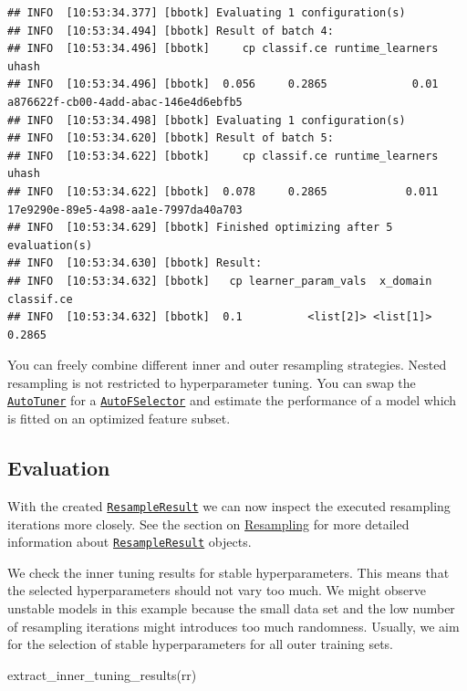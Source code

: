\documentclass[
]{scrbook}
\newenvironment{Shaded}{\begin{snugshade}}{\end{snugshade}}
\newcommand{\FunctionTok}[1]{\textcolor[rgb]{0.00,0.00,0.00}{#1}}
\newcommand{\NormalTok}[1]{#1}
\renewenvironment{Shaded} {\begin{snugshade}\small} {\end{snugshade}}
\begin{document}
\begin{verbatim}
## INFO  [10:53:34.377] [bbotk] Evaluating 1 configuration(s) 
## INFO  [10:53:34.494] [bbotk] Result of batch 4: 
## INFO  [10:53:34.496] [bbotk]     cp classif.ce runtime_learners                                uhash 
## INFO  [10:53:34.496] [bbotk]  0.056     0.2865             0.01 a876622f-cb00-4add-abac-146e4d6ebfb5 
## INFO  [10:53:34.498] [bbotk] Evaluating 1 configuration(s) 
## INFO  [10:53:34.620] [bbotk] Result of batch 5: 
## INFO  [10:53:34.622] [bbotk]     cp classif.ce runtime_learners                                uhash 
## INFO  [10:53:34.622] [bbotk]  0.078     0.2865            0.011 17e9290e-89e5-4a98-aa1e-7997da40a703 
## INFO  [10:53:34.629] [bbotk] Finished optimizing after 5 evaluation(s) 
## INFO  [10:53:34.630] [bbotk] Result: 
## INFO  [10:53:34.632] [bbotk]   cp learner_param_vals  x_domain classif.ce 
## INFO  [10:53:34.632] [bbotk]  0.1          <list[2]> <list[1]>     0.2865
\end{verbatim}

You can freely combine different inner and outer resampling strategies.
Nested resampling is not restricted to hyperparameter tuning.
You can swap the \href{https://mlr3tuning.mlr-org.com/reference/AutoTuner.html}{\texttt{AutoTuner}} for a \href{https://mlr3fselect.mlr-org.com/reference/AutoFSelector.html}{\texttt{AutoFSelector}} and estimate the performance of a model which is fitted on an optimized feature subset.

\hypertarget{nested-resamp-eval}{%
\subsection{Evaluation}\label{nested-resamp-eval}}

With the created \href{https://mlr3.mlr-org.com/reference/ResampleResult.html}{\texttt{ResampleResult}} we can now inspect the executed resampling iterations more closely.
See the section on \protect\hyperlink{resampling}{Resampling} for more detailed information about \href{https://mlr3.mlr-org.com/reference/ResampleResult.html}{\texttt{ResampleResult}} objects.

We check the inner tuning results for stable hyperparameters.
This means that the selected hyperparameters should not vary too much.
We might observe unstable models in this example because the small data set and the low number of resampling iterations might introduces too much randomness.
Usually, we aim for the selection of stable hyperparameters for all outer training sets.

\begin{Shaded}
\begin{Highlighting}[]
\FunctionTok{extract\_inner\_tuning\_results}\NormalTok{(rr)}
\end{Highlighting}
\end{Shaded}
\end{document}
